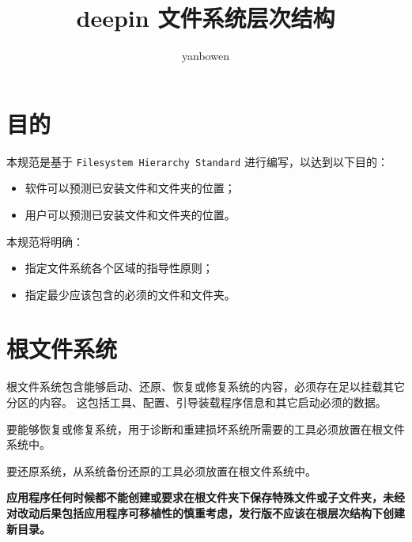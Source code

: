 \documentclass{utart}
\title{deepin 文件系统层次结构}
\author{yanbowen}
\begin{document}
\utMakeTOC

\section{目的}
本规范是基于 \texttt{Filesystem Hierarchy Standard}\cite{FHS} 进行编写，以达到以下目的：
\begin{itemize}[leftmargin=4em]
\item 软件可以预测已安装文件和文件夹的位置；
\item 用户可以预测已安装文件和文件夹的位置。
\end{itemize}

本规范将明确：
\begin{itemize}[leftmargin=4em]
\item 指定文件系统各个区域的指导性原则；
\item 指定最少应该包含的必须的文件和文件夹。
\end{itemize}

\section{根文件系统}
根文件系统包含能够启动、还原、恢复或修复系统的内容，必须存在足以挂载其它分区的内容。
这包括工具、配置、引导装载程序信息和其它启动必须的数据。

要能够恢复或修复系统，用于诊断和重建损坏系统所需要的工具必须放置在根文件系统中。

要还原系统，从系统备份还原的工具必须放置在根文件系统中。

\textbf{应用程序任何时候都不能创建或要求在根文件夹下保存特殊文件或子文件夹，未经对改动后果包括应用程序可移植性的慎重考虑，发行版不应该在根层次结构下创建新目录。}
\end{document}
